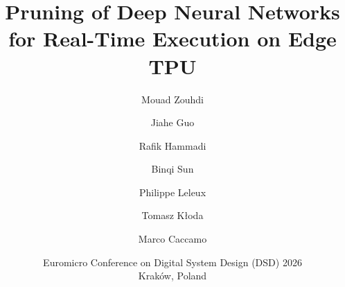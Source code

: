 \title[DSD 2026]{Pruning of Deep Neural Networks\\ for Real-Time Execution on Edge TPU}
\author[Zouhdi et al.]{Mouad Zouhdi \and Jiahe Guo \and Rafik Hammadi \and Binqi Sun
        \and Philippe Leleux \and Tomasz K{\l}oda \and Marco Caccamo}
\date[DSD 2026]{Euromicro Conference on Digital System Design (DSD) 2026\\
              Krak\'ow, Poland}
\subject{Structured pruning and real-time scheduling on Edge TPU}
